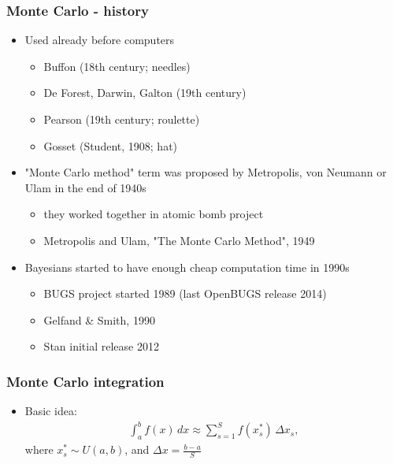 \documentclass[10pt]{beamer}
\begin{document}
\begin{frame}
\frametitle{Monte Carlo - history}

  \begin{itemize}
  \item Used already before computers
    \begin{itemize}
      \item Buffon (18th century; needles)
      \item De Forest, Darwin, Galton (19th century)
      \item Pearson (19th century; roulette)
      \item Gosset (Student, 1908; hat)
    \end{itemize}
    \pause
  \item "Monte Carlo method" term was proposed by Metropolis, von Neumann
    or Ulam in the end of 1940s
     \begin{itemize}
     \item they worked together in atomic bomb project
     \item Metropolis and Ulam, "The Monte Carlo Method", 1949
     \end{itemize}
    \pause
   \item Bayesians started to have enough cheap computation time in 1990s
     \begin{itemize}
     \item BUGS project started 1989 (last OpenBUGS release 2014)
     \item Gelfand \& Smith, 1990
     \item Stan initial release 2012
     \end{itemize}
  \end{itemize}

\end{frame}

\begin{frame}
\frametitle{Monte Carlo integration}

  \begin{itemize}
    \item Basic idea: 
    \begin{align*}
         {\displaystyle \int _{a}^{b}f(x)\,dx \approx \sum _{s=1}^{S}f(x_{s}^{*})\,\Delta x_{s},}
    \end{align*}
    where
    $x_{s}^{*} \sim U(a,b)$, and $\Delta x={\frac {b-a}{S}}$

    \pause
  \end{itemize}

\end{frame}
\end{document}
